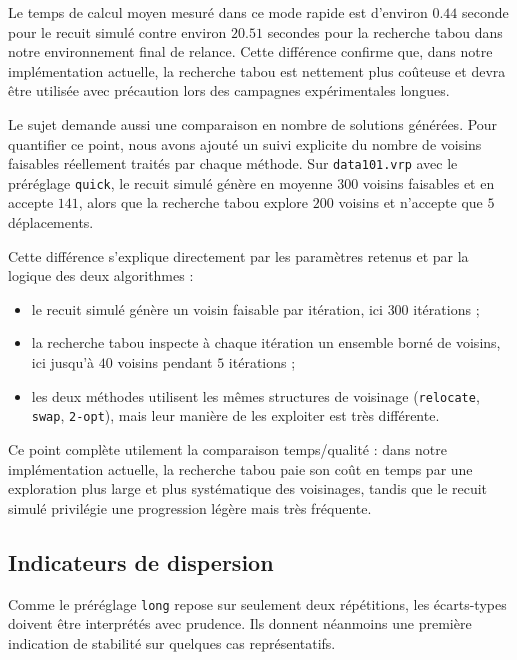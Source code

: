 \documentclass[11pt,a4paper]{article}
\begin{document}
Le temps de calcul moyen mesuré dans ce mode rapide est d'environ \(0.44\) seconde pour le recuit simulé contre environ \(20.51\) secondes pour la recherche tabou dans notre environnement final de relance. Cette différence confirme que, dans notre implémentation actuelle, la recherche tabou est nettement plus coûteuse et devra être utilisée avec précaution lors des campagnes expérimentales longues.

Le sujet demande aussi une comparaison en nombre de solutions générées. Pour quantifier ce point, nous avons ajouté un suivi explicite du nombre de voisins faisables réellement traités par chaque méthode. Sur \texttt{data101.vrp} avec le préréglage \texttt{quick}, le recuit simulé génère en moyenne \(300\) voisins faisables et en accepte \(141\), alors que la recherche tabou explore \(200\) voisins et n'accepte que \(5\) déplacements.

Cette différence s'explique directement par les paramètres retenus et par la logique des deux algorithmes :
\begin{itemize}
    \item le recuit simulé génère un voisin faisable par itération, ici \(300\) itérations ;
    \item la recherche tabou inspecte à chaque itération un ensemble borné de voisins, ici jusqu'à \(40\) voisins pendant \(5\) itérations ;
    \item les deux méthodes utilisent les mêmes structures de voisinage (\texttt{relocate}, \texttt{swap}, \texttt{2-opt}), mais leur manière de les exploiter est très différente.
\end{itemize}

Ce point complète utilement la comparaison temps/qualité : dans notre implémentation actuelle, la recherche tabou paie son coût en temps par une exploration plus large et plus systématique des voisinages, tandis que le recuit simulé privilégie une progression légère mais très fréquente.

\subsection{Indicateurs de dispersion}
Comme le préréglage \texttt{long} repose sur seulement deux répétitions, les écarts-types doivent être interprétés avec prudence. Ils donnent néanmoins une première indication de stabilité sur quelques cas représentatifs.
\end{document}

